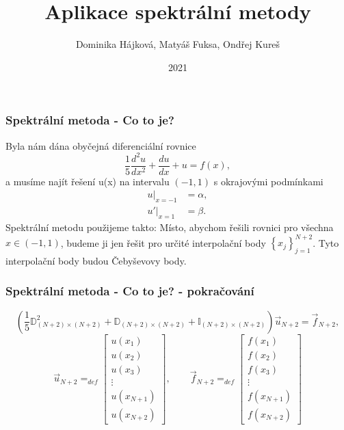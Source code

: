 \documentclass{beamer}
\title{Aplikace spektrální metody}
\author{Dominika Hájková, Matyáš Fuksa, Ondřej Kureš}
\institute{Stormtrooperz}
\date{2021}
\begin{document}
\frame{\titlepage}
\begin{frame}
\frametitle{Spektrální metoda - Co to je?}
Byla nám dána obyčejná diferenciální rovnice
\begin{equation*}
\frac{1}{5}\frac{d^2u}{dx^2}+\frac{du}{dx}+u=f(x),
\end{equation*}
a musíme najít řešení u(x) na intervalu $(-1,1)$ s okrajovými podmínkami
\begin{align*}
\left. u \right|_{x=-1} &= \alpha, \\
\left. u' \right|_{x=1} &= \beta.
\end{align*}
Spektrální metodu použijeme takto: Místo, abychom řešili rovnici pro všechna $x \in (-1,1)$, budeme ji jen řešit pro určité interpolační body $\left\{ x_j \right\}_{j=1}^{N+2}$. Tyto interpolační body budou Čebyševovy body. 
\end{frame}

\begin{frame}
\frametitle{Spektrální metoda - Co to je? - pokračování}
\begin{equation*}
  \left(
    \frac{1}{5}
    \mathbb{D}_{\left(N + 2\right)\times \left(N + 2\right)}^2
    +
    \mathbb{D}_{\left(N + 2\right)\times \left(N + 2\right)}
    +
    \mathbb{I}_{\left(N + 2\right) \times \left(N + 2\right)}
  \right)
  \vec{u}_{N + 2}
  =
  \vec{f}_{N + 2}
  ,
\end{equation*}
\begin{equation*}
  \label{eq:55}
  \vec{u}_{N + 2}
  =_{def}
  \begin{bmatrix}
    u(x_1) \\
    u(x_2) \\
    u(x_3) \\
    \vdots \\
    u(x_{N + 1}) \\
    u(x_{N + 2})
  \end{bmatrix}
  ,
  \qquad
  \vec{f}_{N + 2} = _{def}
  \begin{bmatrix}
    f(x_1) \\
    f(x_2) \\
    f(x_3) \\
    \vdots \\
    f(x_{N + 1}) \\
    f(x_{N + 2})
  \end{bmatrix}
\end{equation*}
\end{frame}
\end{document}
